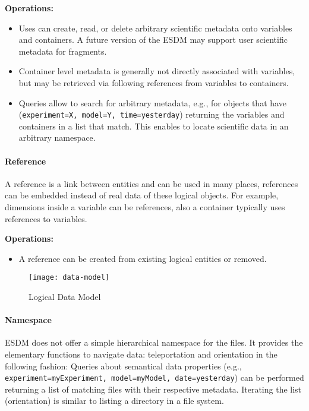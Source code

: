 \textbf{Operations:}
\begin{itemize}
	\item Uses can create, read, or delete arbitrary scientific metadata onto variables and containers.
	A future version of the ESDM may support user scientific metadata for fragments.
	\item Container level metadata is generally not directly associated with variables, but may be retrieved via following
	references from variables to containers.
	\item Queries allow to search for arbitrary metadata, e.g., for objects that have (\texttt{experiment=X, model=Y, time=yesterday})  returning the variables and containers in a list that match.
	This enables to locate scientific data in an arbitrary namespace.
\end{itemize}

\paragraph{Reference}
A reference is a link between entities and can be used in many places, references can be embedded instead of real data of these logical objects.
For example, dimensions inside a variable can be references, also a container typically uses references to variables.

\textbf{Operations:}
\begin{itemize}
	\item A reference can be created from existing logical entities or removed.
\end{itemize}






\begin{figure}
	\centering
	\texttt{[image: data-model]}
	\caption{Logical Data Model}
	\label{fig:data-model}
\end{figure}

\paragraph{Namespace}

ESDM does not offer a simple hierarchical namespace for the files.
It provides the elementary functions to navigate data: teleportation and orientation in the following fashion:
Queries about semantical data properties (e.g., \texttt{experiment=myExperiment, model=myModel, date=yesterday}) can be performed returning a list of matching files with their respective metadata.
Iterating the list (orientation) is similar to listing a directory in a file system.

